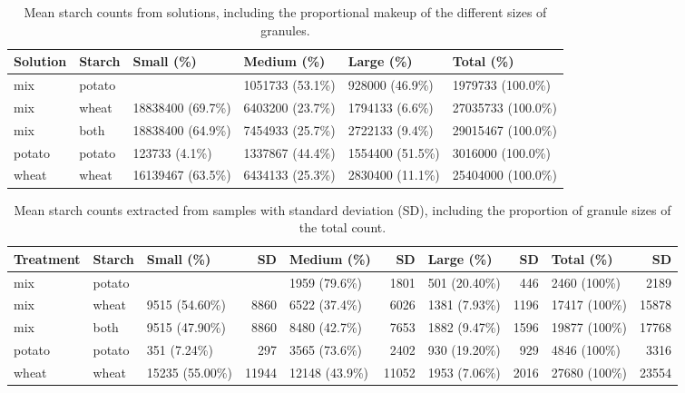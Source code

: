 \documentclass[utf8]{frontiers/frontiersSCNS}
\begin{document}
\begin{table}

\caption{\label{tab:solution-count-tbl}Mean starch counts from solutions, including the
             proportional makeup of the different sizes of granules.}
\centering
\begin{tabular}[t]{l|l|l|l|l|l}
\hline
Solution & Starch & Small (\%) & Medium (\%) & Large (\%) & Total (\%)\\
\hline
mix & potato &  & 1051733 (53.1\%) & 928000 (46.9\%) & 1979733 (100.0\%)\\
\hline
mix & wheat & 18838400 (69.7\%) & 6403200 (23.7\%) & 1794133 (6.6\%) & 27035733 (100.0\%)\\
\hline
mix & both & 18838400 (64.9\%) & 7454933 (25.7\%) & 2722133 (9.4\%) & 29015467 (100.0\%)\\
\hline
potato & potato & 123733 (4.1\%) & 1337867 (44.4\%) & 1554400 (51.5\%) & 3016000 (100.0\%)\\
\hline
wheat & wheat & 16139467 (63.5\%) & 6434133 (25.3\%) & 2830400 (11.1\%) & 25404000 (100.0\%)\\
\hline
\end{tabular}
\end{table}

\begin{table}

\caption{\label{tab:sample-count-tbl}Mean starch counts extracted from samples with standard 
             deviation (SD), including the proportion of granule sizes of the total count.}
\centering
\begin{tabular}[t]{l|l|l|r|l|r|l|r|l|r}
\hline
Treatment & Starch & Small (\%) & SD & Medium (\%) & SD & Large (\%) & SD & Total (\%) & SD\\
\hline
mix & potato &  &  & 1959 (79.6\%) & 1801 & 501 (20.40\%) & 446 & 2460 (100\%) & 2189\\
\hline
mix & wheat & 9515 (54.60\%) & 8860 & 6522 (37.4\%) & 6026 & 1381 (7.93\%) & 1196 & 17417 (100\%) & 15878\\
\hline
mix & both & 9515 (47.90\%) & 8860 & 8480 (42.7\%) & 7653 & 1882 (9.47\%) & 1596 & 19877 (100\%) & 17768\\
\hline
potato & potato & 351 (7.24\%) & 297 & 3565 (73.6\%) & 2402 & 930 (19.20\%) & 929 & 4846 (100\%) & 3316\\
\hline
wheat & wheat & 15235 (55.00\%) & 11944 & 12148 (43.9\%) & 11052 & 1953 (7.06\%) & 2016 & 27680 (100\%) & 23554\\
\hline
\end{tabular}
\end{table}
\end{document}
